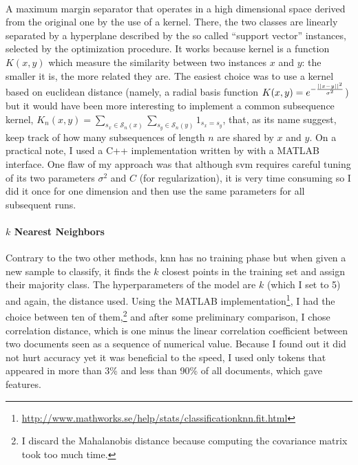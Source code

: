 \paragraph{}

A maximum margin separator that operates in a high dimensional space derived from the original one by the use of a kernel. There, the two classes are linearly separated by a hyperplane described by the so called \enquote{support vector} instances, selected by the optimization procedure. It works because kernel is a function $K(x,y)$ which measure the similarity between two instances $x$ and $y$: the smaller it is, the more related they are. The easiest choice was to use a kernel based on euclidean distance (namely, a radial basis function $K(x,y)=e^{-\frac{\left|\left|x-y\right|\right|^2}{\sigma^2}}$) but it would have been more interesting to implement a common subsequence kernel\autocite{Lodhi2002kernel}, $K_n(x,y)=\sum_{s_x\in\mathcal{S}_n(x)}\sum_{s_y\in\mathcal{S}_n(y)}1_{s_x=s_y}$, that, as its name suggest, keep track of how many subsequences of length $n$ are shared by $x$ and $y$. On a practical note, I used a C++ implementation written by \textcite{Chang2001libsvm} with a MATLAB interface. One flaw of my approach was that although \gls{svm} requires careful tuning of its two parameters $\sigma^2$ and $C$ (for regularization), it is very time consuming so I did it once for one dimension and then use the same parameters for all subsequent runs.

\paragraph{$k$ Nearest Neighbors}
Contrary to the two other methods, \gls{knn} has no training phase but when given a new sample to classify, it finds the $k$ closest points in the training set and assign their majority class. The hyperparameters of the model are $k$ (which I set to 5) and again, the distance used. Using the MATLAB implementation\footnote{\href{http://www.mathworks.se/help/stats/classificationknn.fit.html}{http://www.mathworks.se/help/stats/classificationknn.fit.html}}, I had the choice between ten of them,\footnote{I discard the Mahalanobis distance because computing the covariance matrix took too much time.} and after some preliminary comparison, I chose correlation distance, which is one minus the linear correlation coefficient between two documents seen as a sequence of numerical value. Because I found out it did not hurt accuracy yet it was beneficial to the speed, I used only tokens that appeared in more than 3\% and less than 90\% of all documents, which gave  features.


